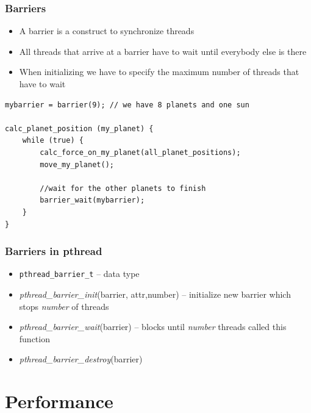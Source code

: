 \documentclass[10pt]{beamer}
\begin{document}
\begin{frame}[fragile]
    \frametitle{Barriers}
    \begin{itemize}
        \item A barrier is a construct to synchronize threads
        \item All threads that arrive at a barrier have to wait until everybody else is there
        \item When initializing we have to specify the maximum number of threads that have to wait
    \end{itemize}

\begin{block}{}
\begin{lstlisting}
mybarrier = barrier(9); // we have 8 planets and one sun

calc_planet_position (my_planet) {
    while (true) {
        calc_force_on_my_planet(all_planet_positions);
        move_my_planet();
        
        //wait for the other planets to finish
        barrier_wait(mybarrier);
    }
}
\end{lstlisting}
\end{block}
\end{frame}


\begin{frame}
    \frametitle{Barriers in pthread}
    \begin{itemize}
    \item \texttt{pthread\_barrier\_t} -- data type
        \item {\it pthread\_barrier\_init}(barrier, attr,number) -- initialize new barrier which stops {\it number} of threads
        \item {\it pthread\_barrier\_wait}(barrier) -- blocks until {\it number} threads called this function
        \item {\it pthread\_barrier\_destroy}(barrier) 
    \end{itemize}
\end{frame}




\section{Performance}
\end{document}
